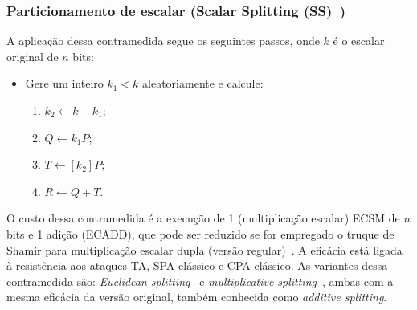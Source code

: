 \documentclass{SBCbookchapter}
\newcommand{\rcv}{\leftarrow}
\begin{document}
\subsubsection{Particionamento de escalar (Scalar Splitting (SS)~\cite{ClavierJoye2001})}
A aplicação dessa contramedida segue os seguintes passos, onde $k$ é o escalar original de $n$ {bits}:
\begin{itemize}
    \item Gere um inteiro $k_1 < k$ aleatoriamente e calcule:
    \begin{enumerate}
    \item $k_2\rcv k - k_1$;
    \item $Q\rcv k_1P$;
    \item $T\rcv[k_2]P$;
    \item $R\rcv Q + T$. 
    \end{enumerate}
\end{itemize}

O custo dessa contramedida é a execução de 1 (multiplicação escalar) ECSM de $n$ bits e 1 adição (ECADD), que pode ser reduzido se for empregado o truque de Shamir para multiplicação escalar dupla (versão regular)~\cite{CietJoye2003}. A eficácia está ligada à resistência aos ataques TA, SPA clássico e CPA clássico. As variantes dessa contramedida são: \emph{Euclidean splitting}~\cite{CietJoye2003} e \textit{multiplicative splitting}~\cite{TrichinaBelleza2003}, ambas com a mesma eficácia da versão original, também conhecida como \textit{additive splitting}.

\end{document}
